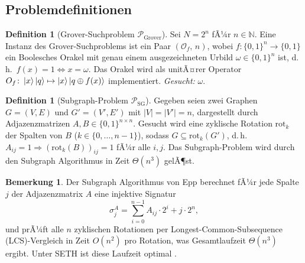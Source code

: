 ﻿\documentclass[11pt,a4paper]{article}
\theoremstyle{definition}
\newtheorem{definition}[theorem]{Definition}
\newtheorem{remark}[theorem]{Bemerkung}
\begin{document}
\subsection{Problemdefinitionen}
\label{subsec:probleme}

\begin{definition}[Grover-Suchproblem $\mathcal{P}_{\mathrm{Grover}}$]
\label{def:grover_problem}
  Sei $N = 2^n$ fÃ¼r $n \in \mathbb{N}$.  Eine Instanz des Grover-Suchproblems ist
  ein Paar $(\mathcal{O}_f,\, n)$, wobei
  $f \colon \{0,1\}^n \to \{0,1\}$ ein Boolesches Orakel mit genau einem
  ausgezeichneten Urbild $\omega \in \{0,1\}^n$ ist, d.\,h.\
  $f(x) = 1 \Leftrightarrow x = \omega$.
  Das Orakel wird als unitÃ¤rer Operator $O_f \colon \ket{x}\ket{q} \mapsto \ket{x}\ket{q \oplus f(x)}$
  implementiert.  \emph{Gesucht:} $\omega$.
\end{definition}

\begin{definition}[Subgraph-Problem $\mathcal{P}_{\mathrm{SG}}$]
\label{def:sg_problem}
  Gegeben seien zwei Graphen $G = (V,E)$ und $G' = (V',E')$ mit
  $|V| = |V'| = n$, dargestellt durch Adjazenzmatrizen $A, B \in \{0,1\}^{n\times n}$.
  Gesucht wird eine zyklische Rotation $\mathrm{rot}_k$ der Spalten von $B$
  ($k \in \{0,\ldots,n-1\}$), sodass $G \subseteq \mathrm{rot}_k(G')$, d.\,h.\
  $A_{ij} = 1 \Rightarrow (\mathrm{rot}_k(B))_{ij} = 1$ fÃ¼r alle $i,j$.
  Das Subgraph-Problem wird durch den Subgraph Algorithmus \cite{Epp2026}
  in Zeit $\Theta(n^3)$ gelÃ¶st.
\end{definition}

\begin{remark}
  Der Subgraph Algorithmus von Epp \cite{Epp2026} berechnet fÃ¼r jede Spalte $j$
  der Adjazenzmatrix $A$ eine injektive Signatur
  \begin{equation}
    \sigma_j^A = \sum_{i=0}^{n-1} A_{ij} \cdot 2^i + j \cdot 2^n,
    \label{eq:signatur}
  \end{equation}
  und prÃ¼ft alle $n$ zyklischen Rotationen per Longest-Common-Subsequence
  (LCS)-Vergleich in Zeit $O(n^2)$ pro Rotation, was Gesamtlaufzeit
  $\Theta(n^3)$ ergibt.  Unter SETH ist diese Laufzeit optimal \cite{Epp2026}.
\end{remark}
\end{document}

